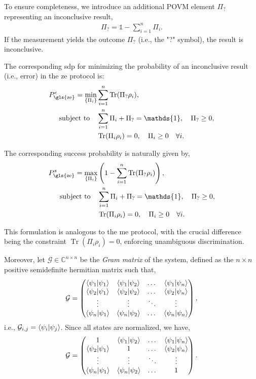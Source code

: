 \documentclass[12pt,letterpaper]{article}
\DeclareMathOperator{\tr}{Tr}
\begin{document}
\begin{multicols}{2}
To ensure completeness, we introduce an additional POVM element $\Pi_?$ representing an inconclusive result,
\begin{align*}
\Pi_? = \mathds{1} - \sum_{i=1}^n \Pi_i.
\end{align*}
If the measurement yields the outcome $\Pi_?$ (i.e., the "?" symbol), the result is inconclusive.

The corresponding \gls{sdp} for minimizing the probability of an inconclusive result (i.e., error) in the \gls{ze} protocol is:
\begin{align*}
	P_{\text{\gls{ze}}}^e = \min_{\left\{\Pi_i\right\}} &\sum_{i=1}^n \tr(\Pi_? \rho_i),\\
	\text{subject to} \quad & \sum_{i=1}^n \Pi_i + \Pi_? = \mathds{1}, \quad \Pi_? \geq 0,\\
	& \tr(\Pi_i \rho_i) = 0, \quad \Pi_i \geq 0 \quad \forall i.
\end{align*}

The corresponding success probability is naturally given by,
\begin{align*}
	P_{\text{\gls{ze}}}^s = \max_{\left\{\Pi_i\right\}} &\left(1 - \sum_{i=1}^n \tr(\Pi_? \rho_i)\right),\\
	\text{subject to} \quad & \sum_{i=1}^n \Pi_i + \Pi_? = \mathds{1}, \quad \Pi_? \geq 0,\\
	& \tr(\Pi_i \rho_i) = 0, \quad \Pi_i \geq 0 \quad \forall i.
\end{align*}

This formulation is analogous to the \gls{me} protocol, with the crucial difference being the constraint $\tr(\Pi_i \rho_i) = 0$, enforcing unambiguous discrimination.

Moreover, let $\mathcal{G} \in \mathbb{C}^{n \times n}$ be the \emph{Gram matrix} of the system, defined as the $n\times n$ positive semidefinite hermitian matrix such that,
\begin{equation*}
	\mathcal{G} =
	\begin{pmatrix}
		\braket{\psi_1|\psi_1} & \braket{\psi_1|\psi_2} & \dots & \braket{\psi_1|\psi_n}\\
		\braket{\psi_2|\psi_1} & \braket{\psi_2|\psi_2} & \dots & \braket{\psi_2|\psi_n}\\
		\vdots & \vdots & \ddots & \vdots\\
		\braket{\psi_n|\psi_1} & \braket{\psi_n|\psi_2} & \dots & \braket{\psi_n|\psi_n}
	\end{pmatrix},
\end{equation*}
i.e., $\mathcal{G}_{i,j} = \braket{\psi_i|\psi_j}$. Since all states are normalized, we have,
\begin{equation*}
	\mathcal{G} =
	\begin{pmatrix}
		1 & \braket{\psi_1|\psi_2} & \dots & \braket{\psi_1|\psi_n}\\
		\braket{\psi_2|\psi_1} & 1 & \dots & \braket{\psi_2|\psi_n}\\
		\vdots & \vdots & \ddots & \vdots\\
		\braket{\psi_n|\psi_1} & \braket{\psi_n|\psi_2} & \dots & 1
	\end{pmatrix}.
\end{equation*}


\end{multicols}
\end{document}
